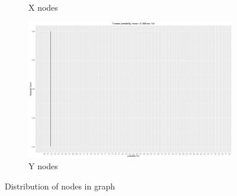 \documentclass[a4paper, 12pt, oneside]{article}
\begin{document}
\begin{figure}[h]
\begin{subfigure}[b]{0.45\textwidth}
\caption{\label{fig:X}X nodes}
\end{subfigure}
\begin{subfigure}[b]{0.45\textwidth}
\includegraphics[width=\textwidth]{graphs/Y_degrees.png}
\caption{\label{fig:Y}Y nodes }
\end{subfigure}
\caption{Distribution of nodes in graph}\label{fig:E_and_I}
\end{figure}
\end{document}
